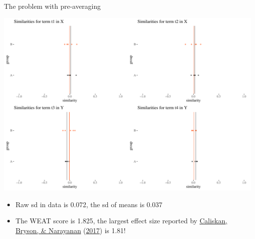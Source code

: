 \documentclass[
  10pt,
  ignorenonframetext,
  x11names, dvipsnames, bibspacing,natbib, table]{beamer}
\providecommand{\tightlist}{%
  \setlength{\itemsep}{0pt}\setlength{\parskip}{0pt}}
\begin{document}
\begin{frame}{The problem with pre-averaging}
\protect\hypertarget{the-problem-with-pre-averaging-1}{}
\vspace{1mm}
\footnotesize

\begin{center}\includegraphics[width=0.95\linewidth]{presentationBoston_files/figure-beamer/unnamed-chunk-9-1} \end{center}
\normalsize

\vspace{1mm}
\footnotesize

\normalsize
\pause

\footnotesize

\vspace{-2mm}

\begin{itemize}
\tightlist
\item
  Raw sd in data is 0.072, the sd of means is 0.037
\item
  The WEAT score is 1.825, the largest effect size reported by
  \protect\hyperlink{ref-Caliskan2017semanticsBiases}{Caliskan, Bryson,
  \& Narayanan}
  (\protect\hyperlink{ref-Caliskan2017semanticsBiases}{2017}) is 1.81!
\end{itemize}
\end{frame}
\end{document}
